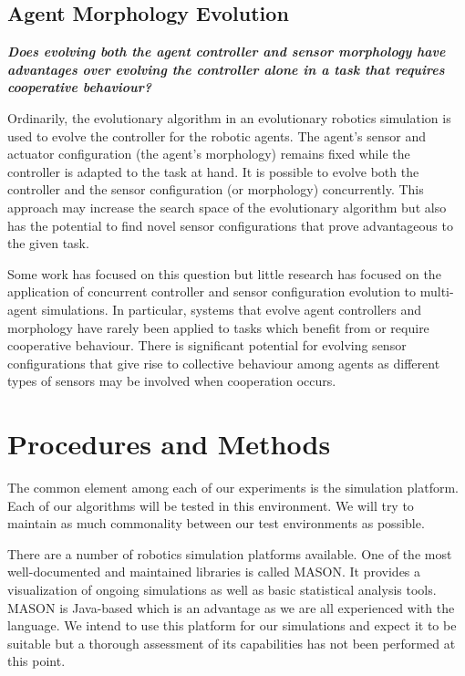 \documentclass[a4paper,12pt]{article}
\begin{document}
\subsection{Agent Morphology Evolution}

\textbf{ \textit{Does evolving both the agent controller and sensor morphology have advantages over evolving the controller alone in a task that requires cooperative behaviour?}}

Ordinarily, the evolutionary algorithm in an evolutionary robotics simulation is used to evolve the controller for the robotic agents. The agent’s sensor and actuator configuration (the agent's morphology) remains fixed while the controller is adapted to the task at hand. It is possible to evolve both the controller and the sensor configuration (or morphology) concurrently. This approach may increase the search space of the evolutionary algorithm but also has the potential to find novel sensor configurations that prove advantageous to the given task.

Some work has focused on this question but little research has focused on the application of concurrent controller and sensor configuration evolution to multi-agent simulations. In particular, systems that evolve agent controllers and morphology have rarely been applied to tasks which benefit from or require cooperative behaviour. There is significant potential for evolving sensor configurations that give rise to collective behaviour among agents as different types of sensors may be involved when cooperation occurs.


\section{Procedures and Methods}
The common element among each of our experiments is the simulation platform. Each of our algorithms will be tested in this environment. We will try to maintain as much commonality between our test environments as possible.

There are a number of robotics simulation platforms available. One of the most well-documented and maintained libraries is called MASON. It provides a visualization of ongoing simulations as well as basic statistical analysis tools. MASON is Java-based which is an advantage as we are all experienced with the language. We intend to use this platform for our simulations and expect it to be suitable but a thorough assessment of its capabilities has not been performed at this point.
\end{document}
